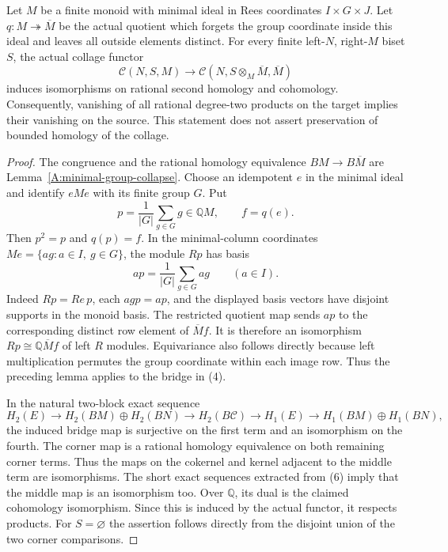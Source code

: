 \begin{theorem}
\label{CP2:A-minimal-group-collapse-collage-H2}
Let $M$ be a finite monoid with minimal ideal in Rees coordinates
$I\times G\times J$.  Let $q:M\twoheadrightarrow\overline M$ be
the actual quotient which forgets the group coordinate inside this
ideal and leaves all outside elements distinct.  For every finite
left-$N$, right-$M$ biset $S$, the actual collage functor
\[
 \mathcal C(N,S,M)\longrightarrow
 \mathcal C(N,S\otimes_M\overline M,\overline M)
                                                               \tag{4}
\]
induces isomorphisms on rational second homology and cohomology.
Consequently, vanishing of all rational degree-two products on the
target implies their vanishing on the source.  This statement does
not assert preservation of bounded homology of the collage.
\end{theorem}
\begin{proof}
The congruence and the rational homology equivalence
$BM\to B\overline M$ are
Lemma~\ref{A:minimal-group-collapse}.  Choose an idempotent $e$ in
the minimal ideal and identify $eMe$ with its finite group $G$.
Put
\[
 p=\frac1{|G|}\sum_{g\in G}g\in\mathbb QM,
 \qquad f=q(e).
\]
Then $p^2=p$ and $q(p)=f$.  In the minimal-column coordinates
$Me=\{ag:a\in I,\ g\in G\}$, the module $Rp$ has basis
\[
 ap=\frac1{|G|}\sum_{g\in G}ag\qquad(a\in I).
                                                               \tag{5}
\]
Indeed $Rp=Re\,p$, each $agp=ap$, and the displayed basis vectors
have disjoint supports in the monoid basis.  The restricted quotient
map sends $ap$ to the corresponding distinct row element of
$\overline M f$.  It is therefore an isomorphism
$Rp\cong\mathbb Q\overline M f$ of left $R$ modules.  Equivariance
also follows directly because left multiplication permutes the
group coordinate within each image row.  Thus the preceding lemma
applies to the bridge in (4).

In the natural two-block exact sequence
\[
 H_2(E)\longrightarrow H_2(BM)\oplus H_2(BN)
 \longrightarrow H_2(B\mathcal C)
 \longrightarrow H_1(E)
 \longrightarrow H_1(BM)\oplus H_1(BN),                         \tag{6}
\]
the induced bridge map is surjective on the first term and an
isomorphism on the fourth.  The corner map is a rational homology
equivalence on both remaining corner terms.  Thus the maps on the
cokernel and kernel adjacent to the middle term are isomorphisms.
The short exact sequences extracted from (6) imply that the middle
map is an isomorphism too.  Over $\mathbb Q$, its dual is the claimed
cohomology isomorphism.  Since this is induced by the actual functor,
it respects products.  For $S=\varnothing$ the assertion follows
directly from the disjoint union of the two corner comparisons.
\end{proof}

